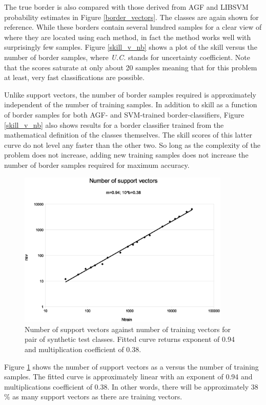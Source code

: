 \documentclass[11pt]{article}
\begin{document}
The true border is also compared with those derived from AGF and LIBSVM
probability estimates in Figure \ref{border_vectors}.
The classes are again shown for reference.
While these borders contain several hundred samples for a clear view of where
they are located using each method, in fact the method works well with
surprisingly few samples.  Figure \ref{skill_v_nb} shows a plot of the skill
versus the number of border samples, where {\it U.C.} stands for
uncertainty coefficient. Note that the scores saturate at only about 20
samples meaning that for this problem at least, very fast classifications are
possible.

Unlike support vectors, the number of border samples required is approximately
independent of the number of training samples.
In addition to skill as a function of border samples for both AGF- and 
SVM-trained border-classifiers, Figure \ref{skill_v_nb} also shows results
for a border classifier trained from the mathematical definition of the 
classes themselves. 
The skill scores of this latter curve do not level any faster than the 
other two.
So long as the complexity of
the problem does not increase, adding new training samples does not increase
the number of border samples required for maximum accuracy.

\begin{figure}
\includegraphics[width=0.9\textwidth]{nsv}
\caption{Number of support vectors against number of training vectors for pair of synthetic test classes. Fitted curve returns exponent of 0.94 and multiplication coefficient of 0.38.}
\label{nsv}
\end{figure}

Figure \ref{nsv} shows the number of support vectors as a versus the
number of training samples. The fitted curve is approximately linear 
with an exponent of 0.94 and multiplications coefficient of 0.38.
In other words, there will be approximately 38 \% as many support vectors as 
there are training vectors.
\end{document}
